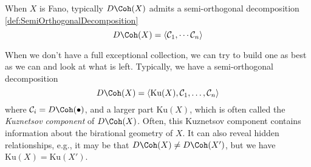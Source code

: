 





When $X$ is Fano, typically $D\Coh(X)$ admits a semi-orthogonal decomposition \cref{def:SemiOrthogonalDecomposition}
    \[D\Coh(X) = \langle \mathcal{C}_1, \cdots \mathcal{C}_n\rangle\]  





When we don't have a full exceptional collection, we can try to build one as best as we can and look at what is left. Typically, we have a semi-orthogonal decomposition 
\[D\Coh(X) = \langle \text{Ku}(X), \mathcal{C}_1, \ldots, \mathcal{C}_n\rangle\]
where $\mathcal{C}_i = D\Coh(\bullet)$, and a larger part $\text{Ku}(X)$, which is often called the \emph{Kuznetsov component} of $D\Coh(X)$. 
Often, this Kuznetsov component contains information about the birational geometry of $X$. It can also reveal hidden relationships, e.g., it may be that $D\Coh(X) \neq D\Coh(X')$, but we have $\text{Ku}(X) = \text{Ku}(X')$. 


